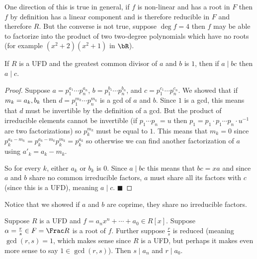 \documentclass[10pt]{article}
\def\divides{{\mid}}
\def\qed{\hskip1cm\hbox{}\hfill$\blacksquare$}
\begin{document}
One direction of this is true in general, if $f$ is non-linear and has a root in $F$ then $f$ by definition has a linear component and is therefore reducible in $F$ and therefore $R$.
But the converse is not true, suppose $\deg f=4$ then $f$ may be able to factorize into the product of two two-degree polynomials which have no roots (for example $(x^2+2)(x^2+1)$ in $\bR$).

\begin{lemm*}

    If $R$ is a UFD and the greatest common divisor of $a$ and $b$ is $1$, then if $a\divides bc$ then $a\divides c$.

\end{lemm*}

\begin{proof}

    Suppose $a=p_1^{a_1}\cdots p_n^{a_n}$, $b=p_1^{b_1}\cdots p_n^{b_n}$, and $c=p_1^{c_1}\cdots p_n^{c_n}$.
    We showed that if $m_k=\minof{a_k,b_k}$ then $d=p_1^{m_k}\cdots p_n^{m_k}$ is a gcd of $a$ and $b$.
    Since $1$ is a gcd, this means that $d$ must be invertible by the definition of a gcd.
    But the product of irreducible elements cannot be invertible (if $p_1\cdots p_n=u$ then $p_1=p_1\cdot p_1\cdots p_n\cdot u^{-1}$ are two factorizations) so $p_k^{m_k}$ must be equal to $1$.
    This means that $m_k=0$ since $p_k^{a_k-m_k}=p_k^{a_k-m_k}p_k^{m_k}=p_k^{a_k}$ so otherwise we can find another factorization of $a$ using $a'_k=a_k-m_k$.

    So for every $k$, either $a_k$ or $b_k$ is $0$.
    Since $a\divides bc$ this means that $bc=xa$ and since $a$ and $b$ share no common irreducible factors, $a$ must share all its factors with $c$ (since this is a UFD), meaning $a\divides c$.
    \qed

\end{proof}

Notice that we showed if $a$ and $b$ are coprime, they share no irreducible factors.

\begin{prop*}

    Suppose $R$ is a UFD and $f=a_nx^n+\cdots+a_0\in R[x]$.
    Suppose $\alpha=\frac rs\in F=\Frac R$ is a root of $f$.
    Further suppose $\frac rs$ is reduced (meaning $\gcd(r,s)=1$, which makes sense since $R$ is a UFD, but perhaps it makes even more sense to say $1\in\gcd(r,s)$).
    Then $s\divides a_n$ and $r\divides a_0$.

\end{prop*}
\end{document}
